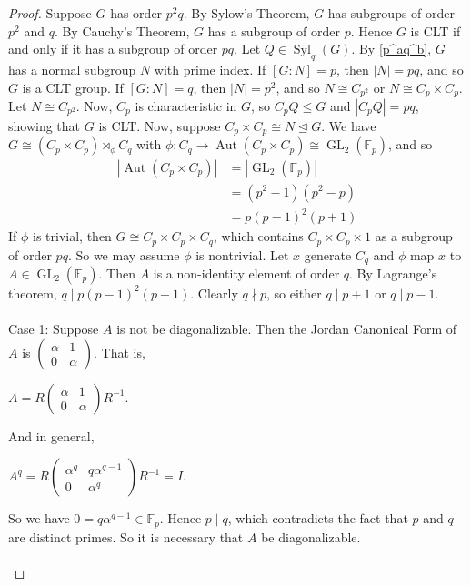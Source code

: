 \documentclass[12pt]{report}
\theoremstyle{newthm}
\DeclareMathOperator{\Syl}{Syl}
\DeclareMathOperator{\Aut}{Aut}
\DeclareMathOperator{\GL}{GL}
\begin{document}
\begin{proof}
Suppose $G$ has order $p^2q$. By Sylow's Theorem, $G$ has subgroups of order $p^2$ and $q$. By Cauchy's Theorem, $G$ has a subgroup of order $p$. Hence $G$ is CLT if and only if it has a subgroup of order $pq$. Let $Q\in \Syl_q(G)$. By \cref{p^aq^b}, $G$ has a normal subgroup $N$ with prime index. If $[G:N]=p$, then $|N|=pq$, and so $G$ is a CLT group. If $[G:N]=q$, then $|N|=p^2$, and so $N\cong C_{p^2}$ or $N\cong C_p \times C_p$. Let $N\cong C_{p^2}$. Now, $C_p$ is characteristic in $G$, so $C_pQ\leq G$ and $|C_pQ|=pq$, showing that $G$ is CLT. Now, suppose $C_p\times C_p\cong N\trianglelefteq G$. We have $G\cong (C_p\times C_p)\rtimes_\phi C_q$ with $\phi:C_q\rightarrow \Aut(C_p\times C_p)\cong \GL_2(\mathbb{F}_p)$, and so
\begin{align*}
    |\Aut(C_p\times C_p)| &= |\GL_2(\mathbb{F}_p)| \\
    &= (p^2-1)(p^2-p) \\
    &= p(p-1)^2(p+1)
\end{align*}
If $\phi$ is trivial, then $G\cong C_p\times C_p \times C_q$, which contains $C_p\times C_p\times {1}$ as a subgroup of order $pq$. So we may assume $\phi$ is nontrivial. Let $x$ generate $C_q$ and $\phi$ map $x$ to $A\in \GL_2(\mathbb{F}_p)$. Then $A$ is a non-identity element of order $q$. By Lagrange's theorem, $q\mid p(p-1)^2(p+1)$. Clearly $q\nmid p$, so either $q\mid p+1$ or $q\mid p-1$.\\~\\
Case 1: Suppose $A$ is not be diagonalizable. Then the Jordan Canonical Form of $A$ is $(\begin{smallmatrix}\alpha & 1\\ 0 & \alpha\end{smallmatrix})$. That is,
\begin{center}
    $A= R\begin{pmatrix} \alpha & 1\\0&\alpha \end{pmatrix}R^{-1}$.\end{center}
    And in general, \begin{center}
    $A^q=R\begin{pmatrix}\alpha^q & q\alpha^{q-1} \\ 0 & \alpha^q \end{pmatrix}R^{-1} = I$.
\end{center} So we have $0=q\alpha^{q-1}\in \mathbb{F}_p$. Hence $p\mid q$, which contradicts the fact that $p$ and $q$ are distinct primes. So it is necessary that $A$ be diagonalizable. \\~\\

\end{proof}
\end{document}

